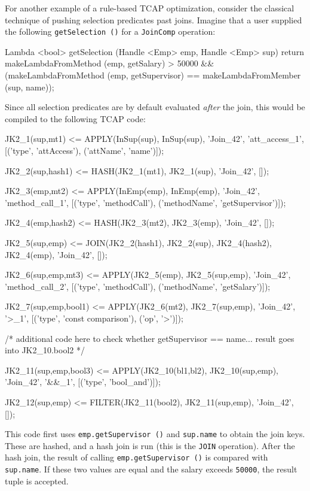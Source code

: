 \noindent
For another example of a rule-based TCAP optimization, 
consider the classical technique of pushing selection predicates past joins.  Imagine that a user supplied the following
\texttt{getSelection ()} for a \texttt{JoinComp} operation:

\begin{codesmall} 
Lambda <bool> getSelection (Handle <Emp> emp, 
    Handle <Emp> sup) {
        return makeLambdaFromMethod (emp, 
            getSalary) > 50000 &&
		(makeLambdaFromMethod (emp, getSupervisor) == 
                 makeLambdaFromMember (sup, name));
}	
\end{codesmall}

\noindent
Since all selection predicates are by default evaluated \emph{after} the join, 
this would be compiled to the following TCAP code:

\begin{codesmall}
JK2_1(sup,mt1) <= APPLY(InSup(sup), InSup(sup),
   'Join_42', 'att_access_1', 
  [('type', 'attAccess'), ('attName', 'name')]);

JK2_2(sup,hash1) <= HASH(JK2_1(mt1), 
   JK2_1(sup), 'Join_42', []);

JK2_3(emp,mt2) <= APPLY(InEmp(emp), 
   InEmp(emp), 'Join_42', 'method_call_1', 
  [('type', 'methodCall'), ('methodName', 'getSupervisor')]);

JK2_4(emp,hash2) <= HASH(JK2_3(mt2),
   JK2_3(emp), 'Join_42', []);

JK2_5(sup,emp) <= JOIN(JK2_2(hash1), JK2_2(sup), 
  JK2_4(hash2), JK2_4(emp), 'Join_42', []);

JK2_6(sup,emp,mt3) <= APPLY(JK2_5(emp), 
   JK2_5(sup,emp), 'Join_42', 'method_call_2',
  [('type', 'methodCall'), ('methodName', 'getSalary')]);

JK2_7(sup,emp,bool1) <= APPLY(JK2_6(mt2), 
   JK2_7(sup,emp), 'Join_42', '>_1', 
  [('type', 'const comparison'), ('op', '>')]);

/* additional code here to check whether 
  getSupervisor == name... 
   result goes into JK2_10.bool2 */

JK2_11(sup,emp,bool3) <= APPLY(JK2_10(bl1,bl2), 
    JK2_10(sup,emp), 'Join_42', '&&_1', 
   [('type', 'bool_and')]);

JK2_12(sup,emp) <= FILTER(JK2_11(bool2),
    JK2_11(sup,emp), 'Join_42', []);
\end{codesmall}
 
\noindent
This code first uses \texttt{emp.getSupervisor ()} and \texttt{sup.name} to obtain the join keys. These are hashed, and 
a hash join is run (this is the \texttt{JOIN} operation).  After the hash join,
the result of calling \texttt{emp.getSupervisor ()} is compared with
\texttt{sup.name}.  If these two values are equal and the salary exceeds \texttt{50000}, the result tuple is accepted.

